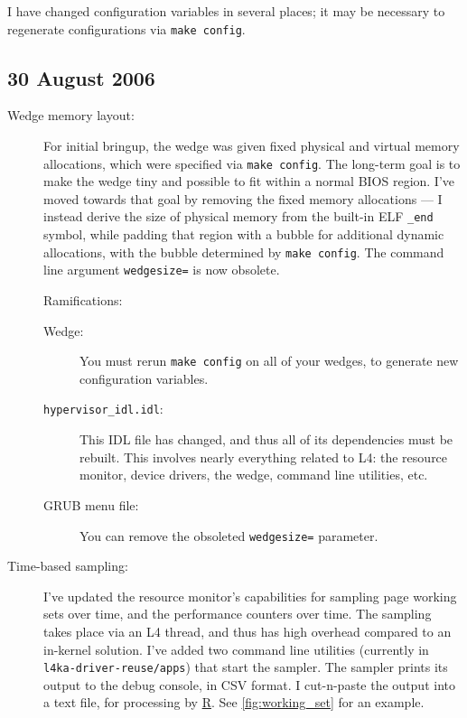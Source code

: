 \documentclass[10pt,a4paper]{article}
\newcommand{\code}[1]{\texttt{#1}}
\newcommand{\cmd}[1]{\texttt{#1}}
\newcommand{\dir}[1]{\texttt{#1}}
\begin{document}
I have changed configuration variables in several places; it may be
necessary to regenerate configurations via \code{make config}.


\subsection*{30 August 2006}

\begin{description}

\item[Wedge memory layout:] For initial bringup, the wedge was given fixed
physical and virtual memory allocations, which were specified via \cmd{make
config}.  The long-term goal is to make the wedge tiny and possible to fit
within a normal BIOS region.  I've moved towards that goal by removing the
fixed memory allocations --- I instead derive the size of physical memory from
the built-in ELF \code{\_end} symbol, while padding that region with a bubble
for additional dynamic allocations, with the bubble determined by \cmd{make
config}.  The command line argument \code{wedgesize=} is now obsolete.

Ramifications: \begin{description}
\item[Wedge:] You must rerun \cmd{make config} on all of your wedges, 
  to generate new configuration variables.
\item[\code{hypervisor\_idl.idl}:] This IDL file has changed, and thus
  all of its dependencies must be rebuilt.  This involves nearly everything
  related to L4: the resource monitor, device drivers, the wedge, command line
  utilities, etc.
\item[GRUB menu file:] You can remove the obsoleted \code{wedgesize=} parameter.
\end{description}

\item[Time-based sampling:] I've updated the resource monitor's
capabilities for sampling page working sets over time, and the
performance counters over time.  The sampling takes place via an L4
thread, and thus has high overhead compared to an in-kernel solution.
I've added two command line utilities (currently in
\dir{l4ka-driver-reuse/apps}) that start the sampler.  The sampler
prints its output to the debug console, in CSV format.  I cut-n-paste
the output into a text file, for processing by
\href{http://www.r-project.org/}{R}.  See
\autoref{fig:working_set} for an example.


\end{description}
\end{document}
